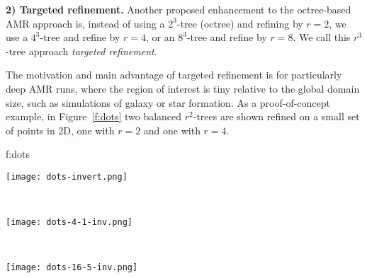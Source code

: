 \documentclass[10pt,twocolumn]{article}
\begin{document}

\textbf{2) Targeted refinement.}  Another proposed enhancement to the
octree-based AMR approach is, instead of using a $2^3$-tree (octree)
and refining by $r=2$, we use a $4^3$-tree and refine by $r=4$, or an
$8^3$-tree and refine by $r=8$.  We call this $r^3$-tree approach
\textit{targeted refinement}.

The motivation and main advantage of targeted refinement is for
particularly deep AMR runs, where the region of interest is tiny
relative to the global domain size, such as simulations of galaxy or
star formation.  As a proof-of-concept example, in Figure~\ref{f:dots}
two balanced $r^2$-trees are shown refined on a small set of points in 2D, one
with $r=2$ and one with $r=4$.

{f:dots}{
\begin{minipage}{3.2in}
\begin{minipage}{1.0in}
\texttt{[image: dots-invert.png]}
\end{minipage} \ 
\begin{minipage}{1.0in}
\texttt{[image: dots-4-1-inv.png]}
\end{minipage} \ 
\begin{minipage}{1.0in}
\texttt{[image: dots-16-5-inv.png]}
\end{minipage}
\end{minipage}}

\end{document}
